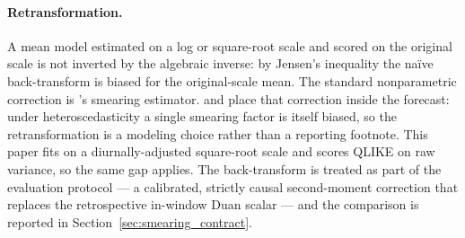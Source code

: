 \paragraph{Retransformation.}
A mean model estimated on a log or square-root scale and scored on
the original scale is not inverted by the algebraic inverse: by
Jensen's inequality the na\"ive back-transform is biased for the
original-scale mean. The standard nonparametric correction is
\citet{Duan1983}'s smearing estimator. \citet{Manning1998} and
\citet{ManningMullahy2001} place that correction inside the forecast:
under heteroscedasticity a single smearing factor is itself biased, so
the retransformation is a modeling choice rather than a reporting
footnote. This paper fits on a diurnally-adjusted square-root scale
and scores QLIKE on raw variance, so the same gap applies. The
back-transform is treated as part of the evaluation protocol --- a
calibrated, strictly causal second-moment correction that replaces the
retrospective in-window Duan scalar --- and the comparison is reported
in Section~\ref{sec:smearing_contract}.